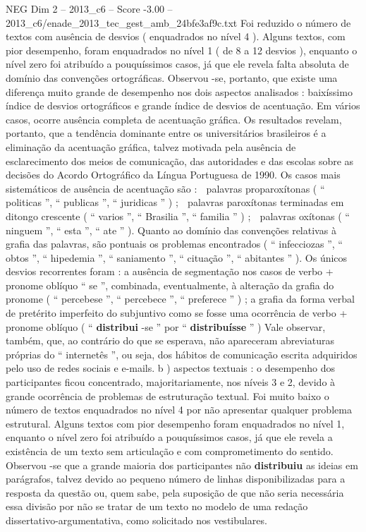 \begin{textsample}{NEG Dim 2 – 2013\_c6 – Score -3.00 – 2013\_c6/enade\_2013\_tec\_gest\_amb\_24bfe3af9c.txt}
Foi reduzido o número de textos com ausência de desvios ( enquadrados no nível 4 ).
Alguns textos, com pior desempenho, foram enquadrados no nível 1 ( de 8 a 12 desvios ), enquanto o nível zero foi atribuído a pouquíssimos casos, já que ele revela falta absoluta de domínio das convenções ortográficas.
Observou -se, portanto, que existe uma diferença muito grande de desempenho nos dois aspectos analisados : baixíssimo índice de desvios ortográficos e grande índice de desvios de acentuação.
Em vários casos, ocorre ausência completa de acentuação gráfica.
Os resultados revelam, portanto, que a tendência dominante entre os universitários brasileiros é a eliminação da acentuação gráfica, talvez motivada pela ausência de esclarecimento dos meios de comunicação, das autoridades e das escolas sobre as decisões do Acordo Ortográfico da Língua Portuguesa de 1990.
Os casos mais sistemáticos de ausência de acentuação são :  palavras proparoxítonas ( “ politicas ”, “ publicas ”, “ juridicas ” ) ;  palavras paroxítonas terminadas em ditongo crescente ( “ varios ”, “ Brasilia ”, “ familia ” ) ;  palavras oxítonas ( “ ninguem ”, “ esta ”, “ ate ” ).
Quanto ao domínio das convenções relativas à grafia das palavras, são pontuais os problemas encontrados ( “ infecciozas ”, “ obtos ”, “ hipedemia ”, “ saniamento ”, “ cituação ”, “ abitantes ” ).
Os únicos desvios recorrentes foram : a ausência de segmentação nos casos de verbo + pronome oblíquo “ se ”, combinada, eventualmente, à alteração da grafia do pronome ( “ percebese ”, “ percebece ”, “ preferece ” ) ; a grafia da forma verbal de pretérito imperfeito do subjuntivo como se fosse uma ocorrência de verbo + pronome oblíquo ( “ \textbf{distribui} -se ” por “ \textbf{distribuísse} ” ) Vale observar, também, que, ao contrário do que se esperava, não apareceram abreviaturas próprias do “ internetês ”, ou seja, dos hábitos de comunicação escrita adquiridos pelo uso de redes sociais e e-mails. b ) aspectos textuais : o desempenho dos participantes ficou concentrado, majoritariamente, nos níveis 3 e 2, devido à grande ocorrência de problemas de estruturação textual.
Foi muito baixo o número de textos enquadrados no nível 4 por não apresentar qualquer problema estrutural.
Alguns textos com pior desempenho foram enquadrados no nível 1, enquanto o nível zero foi atribuído a pouquíssimos casos, já que ele revela a existência de um texto sem articulação e com comprometimento do sentido.
Observou -se que a grande maioria dos participantes não \textbf{distribuiu} as ideias em parágrafos, talvez devido ao pequeno número de linhas disponibilizadas para a resposta da questão ou, quem sabe, pela suposição de que não seria necessária essa divisão por não se tratar de um texto no modelo de uma redação dissertativo-argumentativa, como solicitado nos vestibulares.

\end{textsample}
